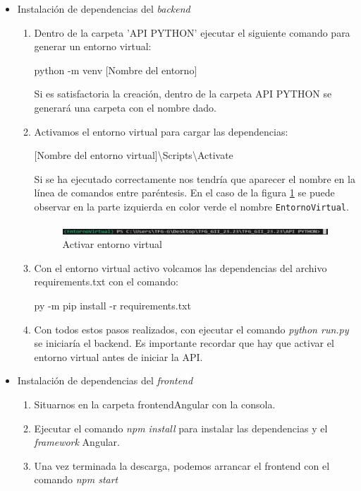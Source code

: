 \begin{itemize}
    \item Instalación de dependencias del \textit{backend}
    \begin{enumerate}
        \item Dentro de la carpeta 'API PYTHON' ejecutar el siguiente comando para generar un entorno virtual:

        python -m venv [Nombre del entorno]
        
        Si es satisfactoria la creación, dentro de la carpeta API PYTHON se generará una carpeta con el nombre dado.

        \item Activamos el entorno virtual para cargar las dependencias:

        [Nombre del entorno virtual]\textbackslash{Scripts}\textbackslash{Activate}

        Si se ha ejecutado correctamente nos tendría que aparecer el nombre en la línea de comandos entre paréntesis. En el caso de la figura \ref{Activar entorno virtual} se puede observar en la parte izquierda en color verde el nombre \texttt{EntornoVirtual}.

        \begin{figure}[h]
            \centering
            \includegraphics[width=1\linewidth]{Imagenes/ActivarVenv.png}
            \caption{Activar entorno virtual}
            \label{Activar entorno virtual}
        \end{figure}
        \FloatBarrier
        
        \item Con el entorno virtual activo volcamos las dependencias del archivo requirements.txt con el comando:

        py -m pip install -r requirements.txt

        \item Con todos estos pasos realizados, con ejecutar el comando \textit{python run.py} se iniciaría el backend. Es importante recordar que hay que activar el entorno virtual antes de iniciar la API.
    \end{enumerate}

    \item Instalación de dependencias del \textit{frontend}
    \begin{enumerate}
        \item Situarnos en la carpeta frontendAngular con la consola.
        \item Ejecutar el comando \textit{npm install} para instalar las dependencias y el \textit{framework} Angular.
        \item Una vez terminada la descarga, podemos arrancar el frontend con el comando \textit{npm start}
    \end{enumerate}
\end{itemize}

